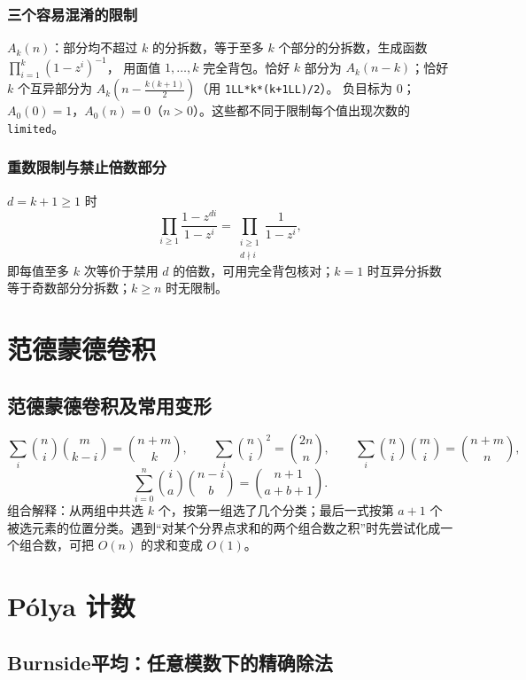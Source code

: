 \subsubsection{三个容易混淆的限制}
$A_k(n)$：部分均不超过 $k$ 的分拆数，等于至多 $k$ 个部分的分拆数，生成函数 $\prod_{i=1}^{k}(1-z^i)^{-1}$，
用面值 $1,\ldots,k$ 完全背包。恰好 $k$ 部分为 $A_k(n-k)$；恰好 $k$ 个互异部分为
$A_k\!\left(n-\frac{k(k+1)}2\right)$（用 \texttt{1LL*k*(k+1LL)/2}）。
负目标为 0；$A_0(0)=1$，$A_0(n)=0$（$n>0$）。这些都不同于限制每个值出现次数的 \texttt{limited}。

\subsubsection{重数限制与禁止倍数部分}
$d=k+1\ge1$ 时
\[
\prod_{i\ge1}\frac{1-z^{di}}{1-z^i}
=\prod_{\substack{i\ge1\\d\nmid i}}\frac1{1-z^i},
\]
即每值至多 $k$ 次等价于禁用 $d$ 的倍数，可用完全背包核对；$k=1$ 时互异分拆数等于奇数部分分拆数；$k\ge n$ 时无限制。


\Needspace{180pt}

\section{范德蒙德卷积}

\subsection{范德蒙德卷积及常用变形}\label{knowledge-vandermonde}
\[
\sum_{i}\binom ni\binom m{k-i}=\binom{n+m}k,\qquad \sum_i\binom ni^2=\binom{2n}n,\qquad \sum_i\binom ni\binom mi=\binom{n+m}n,
\]
\[
\sum_{i=0}^{n}\binom ia\binom{n-i}b=\binom{n+1}{a+b+1}.
\]
组合解释：从两组中共选 $k$ 个，按第一组选了几个分类；最后一式按第 $a+1$ 个被选元素的位置分类。遇到“对某个分界点求和的两个组合数之积”时先尝试化成一个组合数，可把 $O(n)$ 的求和变成 $O(1)$。


\Needspace{652pt}

\section{Pólya 计数}

\subsection{Burnside平均：任意模数下的精确除法}\label{compact-BurnsideAverage}

